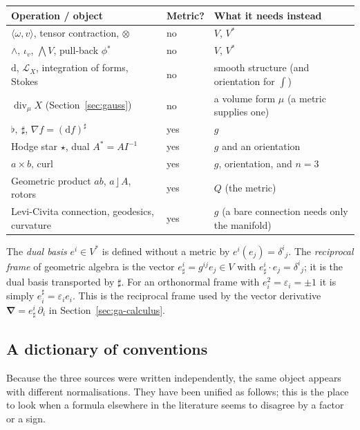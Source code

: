 \documentclass[11pt,a4paper]{article}
\renewcommand{\arraystretch}{1.25}
\numberwithin{equation}{section}
\theoremstyle{definition}
\theoremstyle{plain}
\newcommand{\dd}{\mathrm{d}}
\newcommand{\Lie}{\mathcal{L}}
\newcommand{\pb}{{}^{*}}                            %
\newcommand{\lc}{\mathbin{\rfloor}}
\newcommand{\pss}{I}
\newcommand{\dual}[1]{#1^{\ast}}
\newcommand{\hodge}{\star}
\newcommand{\vd}{\boldsymbol{\nabla}}               %
\begin{document}
\begin{center}
\small
\renewcommand{\arraystretch}{1.3}
\begin{tabular}{@{}p{4.9cm}p{2.2cm}p{7.2cm}@{}}
\toprule
\textbf{Operation / object} & \textbf{Metric?} & \textbf{What it needs instead}\\
\midrule
$\langle\omega,v\rangle$, tensor contraction, $\otimes$ & no & $V$, $V^*$\\
$\wedge$, $\iota_v$, $\bigwedge V$, pull-back $\phi\pb$ & no & $V$, $V^*$\\
$\dd$, $\Lie_X$, integration of forms, Stokes & no & smooth structure (and orientation for $\int$)\\
$\operatorname{div}_\mu X$ (Section~\ref{sec:gauss}) & no & a volume form $\mu$ (a metric supplies one)\\
$\flat,\ \sharp$, $\nabla f=(\dd f)^\sharp$ & yes & $g$\\
Hodge star $\hodge$, dual $\dual A=A\pss^{-1}$ & yes & $g$ and an orientation\\
$a\times b$, curl & yes & $g$, orientation, and $n=3$\\
Geometric product $ab$, $a\lc A$, rotors & yes & $Q$ (the metric)\\
Levi-Civita connection, geodesics, curvature & yes & $g$ (a bare connection needs only the manifold)\\
\bottomrule
\end{tabular}
\end{center}

\begin{remark}\label{rem:reciprocal}
The \emph{dual basis} $e^i\in V^*$ is defined without a metric by $e^i(e_j)=\delta^i{}_j$. The \emph{reciprocal frame} of geometric algebra is the vector $e^i_\sharp=g^{ij}e_j\in V$ with $e^i_\sharp\cdot e_j=\delta^i{}_j$; it is the dual basis transported by $\sharp$. For an orthonormal frame with $e_i^2=\varepsilon_i=\pm1$ it is simply $e_i^\sharp=\varepsilon_ie_i$. This is the reciprocal frame
used by the vector derivative $\vd=e^i_\sharp\,\partial_i$ in Section~\ref{sec:ga-calculus}.
\end{remark}

\subsection{A dictionary of conventions}\label{sec:conventions}

Because the three sources were written independently, the same object appears with different normalisations. They have been unified
as follows; this is the place to look when a formula elsewhere in the literature seems to disagree by a factor or a sign.
\end{document}
